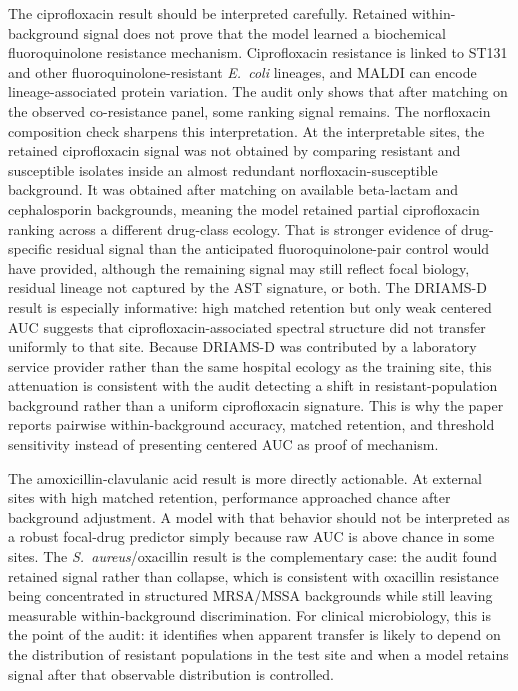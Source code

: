 \documentclass[11pt]{article}
\begin{document}
The ciprofloxacin result should be interpreted carefully. Retained within-background signal does not prove that the model learned a biochemical fluoroquinolone resistance mechanism. Ciprofloxacin resistance is linked to ST131 and other fluoroquinolone-resistant \textit{E.~coli} lineages, and MALDI can encode lineage-associated protein variation. The audit only shows that after matching on the observed co-resistance panel, some ranking signal remains. The norfloxacin composition check sharpens this interpretation. At the interpretable sites, the retained ciprofloxacin signal was not obtained by comparing resistant and susceptible isolates inside an almost redundant norfloxacin-susceptible background. It was obtained after matching on available beta-lactam and cephalosporin backgrounds, meaning the model retained partial ciprofloxacin ranking across a different drug-class ecology. That is stronger evidence of drug-specific residual signal than the anticipated fluoroquinolone-pair control would have provided, although the remaining signal may still reflect focal biology, residual lineage not captured by the AST signature, or both. The DRIAMS-D result is especially informative: high matched retention but only weak centered AUC suggests that ciprofloxacin-associated spectral structure did not transfer uniformly to that site. Because DRIAMS-D was contributed by a laboratory service provider rather than the same hospital ecology as the training site\cite{weis2022driams}, this attenuation is consistent with the audit detecting a shift in resistant-population background rather than a uniform ciprofloxacin signature. This is why the paper reports pairwise within-background accuracy, matched retention, and threshold sensitivity instead of presenting centered AUC as proof of mechanism.

The amoxicillin-clavulanic acid result is more directly actionable. At external sites with high matched retention, performance approached chance after background adjustment. A model with that behavior should not be interpreted as a robust focal-drug predictor simply because raw AUC is above chance in some sites. The \textit{S.~aureus}/oxacillin result is the complementary case: the audit found retained signal rather than collapse, which is consistent with oxacillin resistance being concentrated in structured MRSA/MSSA backgrounds while still leaving measurable within-background discrimination. For clinical microbiology, this is the point of the audit: it identifies when apparent transfer is likely to depend on the distribution of resistant populations in the test site and when a model retains signal after that observable distribution is controlled.
\end{document}
